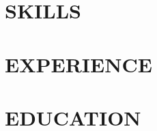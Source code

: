 \documentclass[12pt, letterpaper]{article}
\begin{document}
\section{SKILLS}
\section{EXPERIENCE}
\section{EDUCATION}
\end{document}
